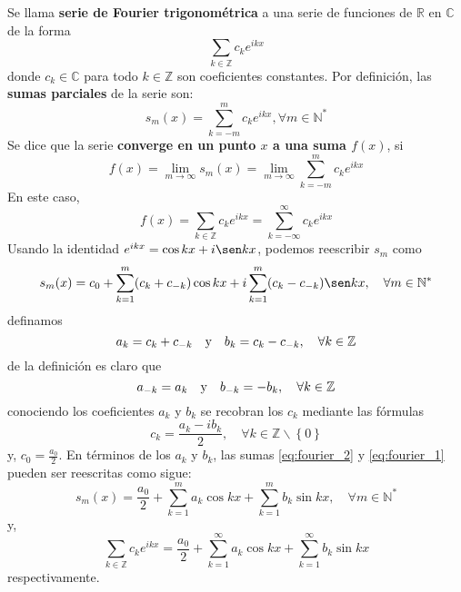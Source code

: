 \documentclass[12pt]{report}
\theoremstyle{largebreak}
\begin{document}
    \begin{mydef}
        Se llama \textbf{serie de Fourier trigonométrica} a una serie de funciones de $\mathbb{R}$ en $\mathbb{C}$ de la forma
        \begin{equation}
            \sum_{k\in\mathbb{Z}}c_k e^{ ikx}
            \label{eq:fourier_1}
        \end{equation}
        donde $c_k\in\mathbb{C}$ para todo $k\in\mathbb{Z}$ son coeficientes constantes. Por definición, las \textbf{sumas parciales} de la serie son:
        \begin{equation*}
            s_m(x)=\sum_{ k=-m}^{m} c_{k}e^{ikx},\forall m\in\mathbb{N}^*
        \end{equation*}
        Se dice que la serie \textbf{converge en un punto $x$ a una suma $f(x)$}, si
        \begin{equation*}
            f(x)=\lim_{ m\rightarrow\infty}s_m(x)=\lim_{ m\rightarrow\infty}\sum_{ k=-m}^m c_k e^{ikx }
        \end{equation*}
        En este caso,
        \begin{equation*}
            f(x)=\sum_{ k\in\mathbb{Z}}c_ke^{ ikx}=\sum_{ k=-\infty}^\infty c_ke^{ ikx}
        \end{equation*}
        Usando la identidad $e^{ ikx}=\cos kx+i\sen kx$, podemos reescribir $s_m$ como
        \begin{equation}
            s_m(x)=c_0+\sum_{ k=1}^m(c_k+c_{ -k})\cos kx+i\sum_{ k=1}^m(c_k-c_{ -k})\sen kx,\quad\forall m\in\mathbb{N}^*
            \label{eq:fourier_2}
        \end{equation}
        definamos
        \begin{equation}
            a_k=c_k+c_{ -k}\quad\textup{y}\quad b_k=c_k-c_{ -k},\quad\forall k\in\mathbb{Z}
            \label{eq:coef_fourier_1}
        \end{equation}
        de la definición es claro que
        \begin{equation*}
            a_{ -k}=a_k\quad\textup{y}\quad b_{-k}=-b_k,\quad\forall k\in\mathbb{Z}
        \end{equation*}
        conociendo los coeficientes $a_k$ y $b_k$ se recobran los $c_k$ mediante las fórmulas
        \begin{equation}
            c_k=\frac{a_k-ib_k}{2},\quad\forall k\in\mathbb{Z}\backslash\left\{0 \right\}
            \label{eq:coef_fourier_2}
        \end{equation}
        y, $c_0=\frac{a_0}{2}$. En términos de los $a_k$ y $b_k$, las sumas \ref{eq:fourier_2} y \ref{eq:fourier_1} pueden ser reescritas como sigue:
        \begin{equation}
            s_m(x)=\frac{a_0}{2}+\sum_{ k=1}^m a_k\cos kx+\sum_{ k=1}^m b_k\sin kx,\quad\forall m\in\mathbb{N}^*
            \label{eq:fourier_3}
        \end{equation}
        y,
        \begin{equation}
            \sum_{k\in\mathbb{Z}}c_k e^{ ikx}=\frac{a_0}{2}+\sum_{ k=1}^\infty a_k\cos kx+\sum_{ k=1}^\infty b_k\sin kx
            \label{eq:fourier_4}
        \end{equation}
        respectivamente.
    \end{mydef}
\end{document}
